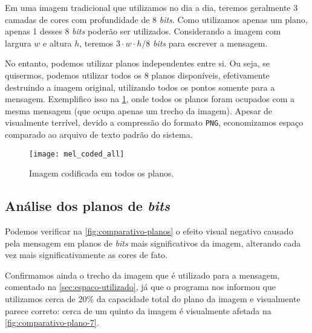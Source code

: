 \documentclass[brazilian,a4paper,twocolumn]{article}
\begin{document}
        Em uma imagem tradicional que utilizamos no dia a dia, teremos geralmente 3 camadas de cores com profundidade de 8 \textit{bits}. Como utilizamos apenas um plano, apenas 1 desses 8 \textit{bits} poderão ser utilizados. Considerando a imagem com largura $w$ e altura $h$, teremos $ 3 \cdot w \cdot h / 8 $ \textit{bits} para escrever a mensagem.

        No entanto, podemos utilizar planos independentes entre si. Ou seja, se quisermos, podemos utilizar todos os 8 planos disponíveis, efetivamente destruindo a imagem original, utilizando todos os pontos somente para a mensagem. Exemplifico isso na \cref{fig:mel-coded-todos}, onde todos os planos foram ocupados com a mesma mensagem (que ocupa apenas um trecho da imagem). Apesar de visualmente terrível, devido a compressão do formato \texttt{PNG}, economizamos espaço comparado ao arquivo de texto padrão do sistema.

        \begin{figure}[h]
            \centering
            \texttt{[image: mel\_coded\_all]}
            \caption{Imagem codificada em todos os planos.}
            \label{fig:mel-coded-todos}
        \end{figure}

    \subsection{Análise dos planos de \textit{bits}}
    \label{sec:efeito-plano-bits}

        Podemos verificar na \cref{fig:comparativo-planos} o efeito visual negativo causado pela mensagem em planos de \textit{bits} mais significativos da imagem, alterando cada vez mais significativamente as cores de fato.

        Confirmamos ainda o trecho da imagem que é utilizado para a mensagem, comentado na \cref{sec:espaco-utilizado}, já que o programa nos informou que utilizamos cerca de $20\%$ da capacidade total do plano da imagem e visualmente parece correto: cerca de um quinto da imagem é visualmente afetada na \cref{fig:comparativo-plano-7}.
\end{document}
